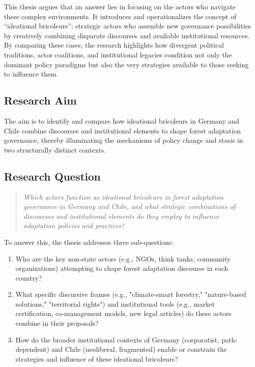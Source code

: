 This thesis argues that an answer lies in focusing on the actors who navigate 
these complex environments. It introduces and operationalizes the concept 
of ``ideational bricoleurs'': strategic actors who assemble new governance 
possibilities by creatively combining disparate discourses and available 
institutional resources. By comparing these cases, the research highlights how 
divergent political traditions, actor coalitions, and institutional legacies 
condition not only the dominant policy paradigms but also the very strategies 
available to those seeking to influence them.

\subsection*{Research Aim}

The aim is to identify and compare how ideational bricoleurs in Germany and Chile 
combine discourses and institutional elements to shape forest adaptation governance, 
thereby illuminating the mechanisms of policy change and stasis in two structurally 
distinct contexts.

\subsection*{Research Question}
\begin{quote}
\textit{Which actors function as ideational bricoleurs in forest adaptation governance 
in Germany and Chile, and what strategic combinations of discourses and institutional 
elements do they employ to influence adaptation policies and practices?}
\end{quote}

To answer this, the thesis addresses three sub-questions:
\begin{enumerate}
    \item Who are the key non-state actors (e.g., NGOs, think tanks, community 
    organizations) attempting to shape forest adaptation discourse in each country?
    \item What specific discursive frames (e.g., "climate-smart forestry," 
    "nature-based solutions," "territorial rights") and institutional tools 
    (e.g., market certification, co-management models, new legal articles) do 
    these actors combine in their proposals?
    \item How do the broader institutional contexts of Germany (corporatist, 
    path-dependent) and Chile (neoliberal, fragmented) enable or constrain 
    the strategies and influence of these ideational bricoleurs?
\end{enumerate}

